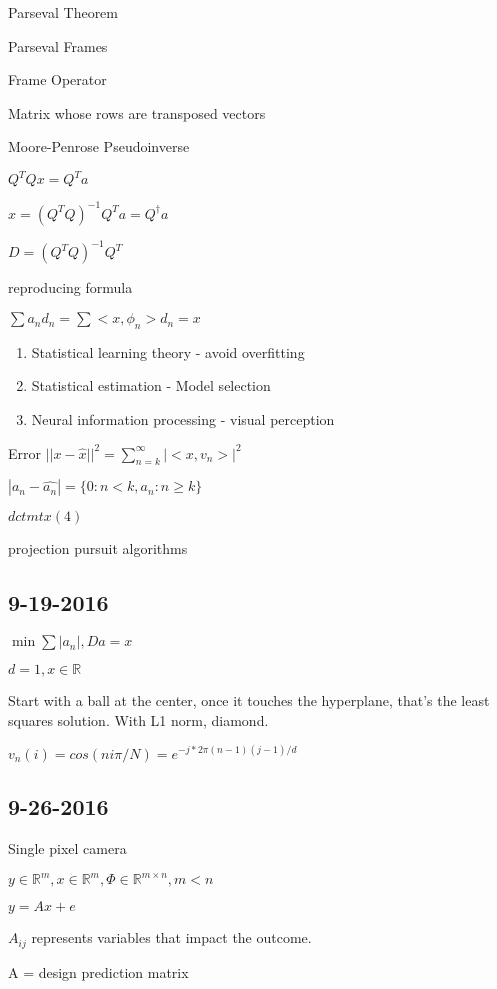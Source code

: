 \documentclass[12pt,letterpaper]{report}
\author{Michael Kummer}
\begin{document}
Parseval Theorem

Parseval Frames

Frame Operator

	Matrix whose rows are transposed vectors

Moore-Penrose Pseudoinverse

	$Q^TQx = Q^Ta$

	$x = (Q^TQ)^{-1}Q^Ta = Q^\dagger a$

$D = (Q^TQ)^{-1}Q^T$

reproducing formula

$\sum a_n d_n = \sum <x, \phi_n>d_n = x$

\begin{enumerate}
\item Statistical learning theory  - avoid overfitting
\item Statistical estimation - Model selection
\item Neural information processing - visual perception
\end{enumerate}

Error $||x - \hat{x}||^2 = \sum^\infty_{n=k}|<x, v_n>|^2$

$|a_n - \hat{a_n}| = \{ 0 : n < k, a_n : n \geq k\}$

$dctmtx(4)$

projection pursuit algorithms


\subsection*{9-19-2016}

$\min \sum |a_n|, Da = x$

$d = 1, x \in \mathbb{R}$

Start with a ball at the center, once it touches the hyperplane, that's the least squares solution.  With L1 norm, diamond.

$v_n(i) = cos(ni\pi /N) = e^{-j*2\pi (n-1)(j-1)/d}$

\subsection*{9-26-2016}

Single pixel camera

$y \in \mathbb{R}^m, x \in \mathbb{R}^m, \Phi \in \mathbb{R}^{m \times n}, m < n$

$y = Ax + e$

$A_{ij}$ represents variables that impact the outcome.

A = design prediction matrix
\end{document}
